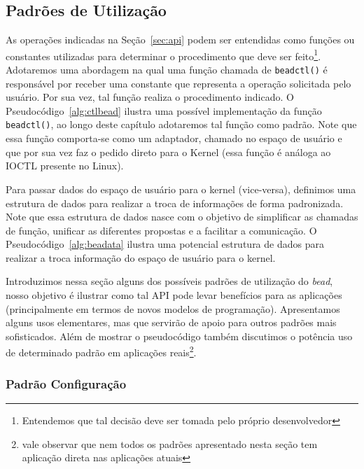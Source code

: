 \subsection{Padrões de Utilização}
As operações indicadas na Seção~\ref{sec:api} podem ser entendidas como funções
ou constantes utilizadas para determinar o procedimento que deve ser
feito\footnote{Entendemos que tal decisão deve ser tomada pelo próprio
desenvolvedor}. Adotaremos uma abordagem na qual uma função chamada de
\texttt{beadctl()} é responsável por receber uma constante que representa a
operação solicitada pelo usuário. Por sua vez, tal função realiza o
procedimento indicado. O Pseudocódigo~\ref{alg:ctlbead} ilustra uma possível
implementação da função \texttt{beadctl()}, ao longo deste capítulo adotaremos
tal função como padrão. Note que essa função comporta-se como um adaptador,
chamado no espaço de usuário e que por sua vez faz o pedido direto para o
Kernel (essa função é análoga ao IOCTL presente no Linux).



Para passar dados do espaço de usuário para o kernel (vice-versa), definimos
uma estrutura de dados para realizar a troca de informações de forma
padronizada.  Note que essa estrutura de dados nasce com o objetivo de
simplificar as chamadas de função, unificar as diferentes propostas e a
facilitar a comunicação.  O Pseudocódigo~\ref{alg:beadata} ilustra uma
potencial estrutura de dados para realizar a troca informação do espaço de
usuário para o kernel.



Introduzimos nessa seção alguns dos possíveis padrões de utilização do
\emph{bead}, nosso objetivo é ilustrar como tal API pode levar benefícios para
as aplicações (principalmente em termos de novos modelos de programação).
Apresentamos alguns usos elementares, mas que servirão de apoio para outros
padrões mais sofisticados. Além de mostrar o pseudocódigo também discutimos o
potência uso de determinado padrão em aplicações reais\footnote{vale observar
que nem todos os padrões apresentado nesta seção tem aplicação direta nas
aplicações atuais}.

\subsubsection{Padrão Configuração}

